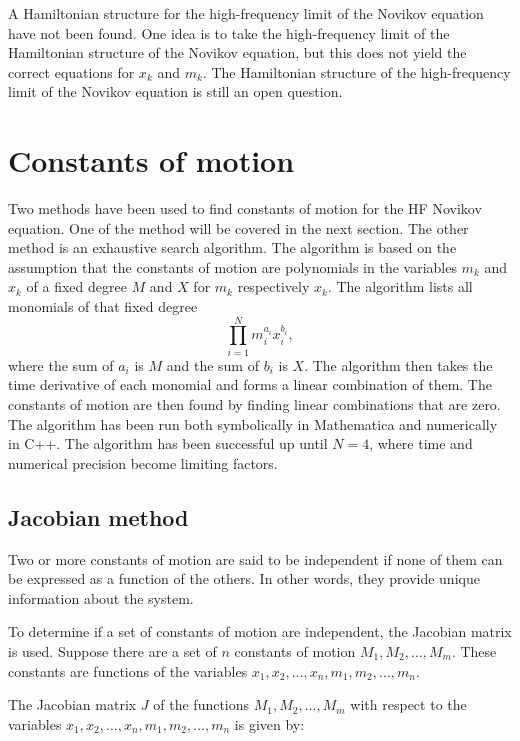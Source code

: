 \documentclass[english,master]{liumaiex}
\theoremstyle{plain}
\theoremstyle{definition}
\begin{document}
A Hamiltonian structure for the high-frequency limit of the Novikov equation have not been found. One idea is to take the high-frequency limit of the Hamiltonian structure of the Novikov equation, but this does not yield the correct equations for $x_k$ and $m_k$. The Hamiltonian structure of the high-frequency limit of the Novikov equation is still an open question.

\section{Constants of motion}

Two methods have been used to find constants of motion for the HF Novikov equation. One of the method will be covered in the next section. The other method is an exhaustive search algorithm. The algorithm is based on the assumption that the constants of motion are polynomials in the variables $m_k$ and $x_k$ of a fixed degree $M$ and $X$ for $m_k$ respectively $x_k$. The algorithm lists all monomials of that fixed degree
\begin{equation}
	\prod_{i=1}^{N} m_i^{a_i} x_i^{b_i},
\end{equation}
where the sum of $a_i$ is $M$ and the sum of $b_i$ is $X$. The algorithm then takes the time derivative of each monomial and forms a linear combination of them. The constants of motion are then found by finding linear combinations that are zero. The algorithm has been run both symbolically in Mathematica and numerically in C++. The algorithm has been successful up until $N = 4$, where time and numerical precision become limiting factors.

\subsection*{Jacobian method}
Two or more constants of motion are said to be independent if none of them can be expressed as a function of the others. In other words, they provide unique information about the system.

To determine if a set of constants of motion are independent, the Jacobian matrix is used. Suppose there are a set of $n$ constants of motion $M_1,M_2,\dots,M_m$. These constants are functions of the variables $x_1,x_2,\dots,x_n,m_1,m_2,\dots,m_n$.

The Jacobian matrix $J$ of the functions ${M_1,M_2,\dots,M_m}$ with respect to the variables ${x_1,x_2,\dots,x_n,m_1,m_2,\dots,m_n}$ is given by:
\end{document}

